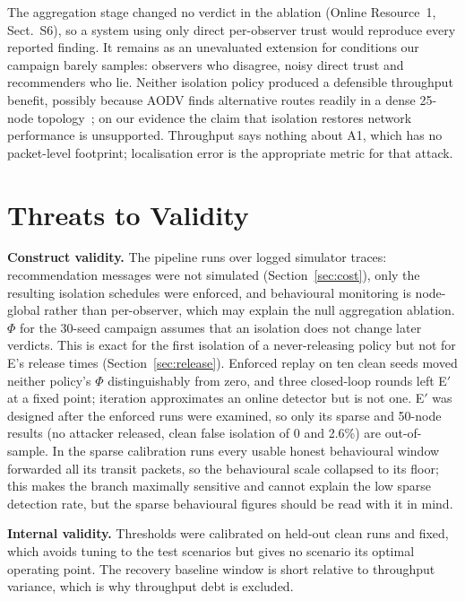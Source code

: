 \documentclass[pdflatex,sn-mathphys-num]{sn-jnl}%
\theoremstyle{thmstyleone}%
\theoremstyle{thmstyletwo}%
\theoremstyle{thmstylethree}%
\begin{document}
The aggregation stage changed no verdict in the ablation (Online Resource~1,
Sect.~S6), so a system using only direct per-observer trust would reproduce
every reported finding. It remains as an unevaluated extension for conditions
our campaign barely samples: observers who disagree, noisy direct trust and
recommenders who lie. Neither isolation policy produced a defensible
throughput benefit, possibly because AODV finds alternative routes readily in
a dense 25-node topology~\cite{sirajuddin2021tbsmr,kavitha2019india,buksh2024trust};
on our evidence the claim that isolation restores network performance is
unsupported. Throughput says nothing about A1, which has no packet-level
footprint; localisation error is the appropriate metric for that attack.

\section{Threats to Validity}
\label{sec:threats}

\textbf{Construct validity.} The pipeline runs over logged simulator traces:
recommendation messages were not simulated (Section~\ref{sec:cost}), only the
resulting isolation schedules were enforced, and behavioural monitoring is
node-global rather than per-observer, which may explain the null aggregation
ablation. $\Phi$ for the 30-seed campaign assumes that an isolation does not
change later verdicts. This is exact for the first isolation of a
never-releasing policy but not for E's release times
(Section~\ref{sec:release}). Enforced replay on ten clean seeds moved neither
policy's $\Phi$ distinguishably from zero, and three closed-loop rounds left
E$'$ at a fixed point; iteration approximates an online detector but is not
one. E$'$ was designed after the enforced runs were examined, so only its
sparse and 50-node results (no attacker released, clean false isolation of 0
and 2.6\%) are out-of-sample. In the sparse calibration runs every usable
honest behavioural window forwarded all its transit packets, so the
behavioural scale collapsed to its floor; this makes the branch maximally
sensitive and cannot explain the low sparse detection rate, but the sparse
behavioural figures should be read with it in mind.

\textbf{Internal validity.} Thresholds were calibrated on held-out clean runs
and fixed, which avoids tuning to the test scenarios but gives no scenario its
optimal operating point. The recovery baseline window is short relative to
throughput variance, which is why throughput debt is excluded.
\end{document}
